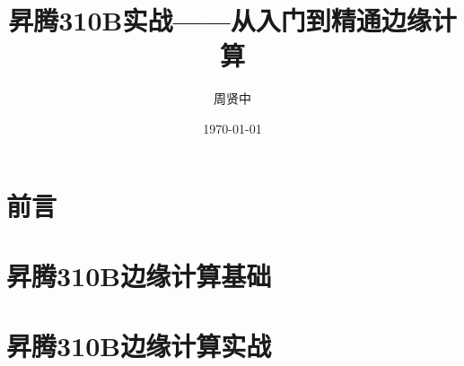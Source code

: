 \documentclass[fontsize=12pt, paper=a4, twoside, openright, DIV=calc]{scrbook}
\title{昇腾310B实战——从入门到精通边缘计算}
\author{周贤中}
\date{\today}
\theoremstyle{break}
\begin{document}
\maketitle

\frontmatter
\chapter*{前言}



\tableofcontents

\mainmatter


\chapter{昇腾310B边缘计算基础}


\chapter{昇腾310B边缘计算实战}








\end{document}
